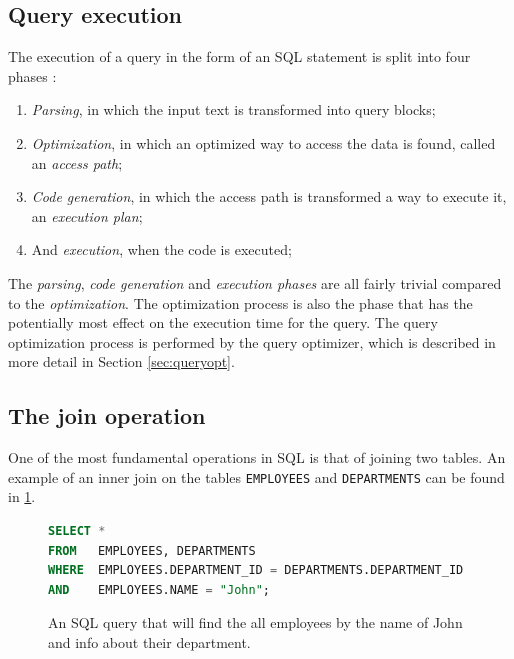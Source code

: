 \subsection{Query execution}
The execution of a query in the form of an SQL statement is split into four phases \cite{selinger_1979_access_apsiardms}:
\begin{enumerate}
    \item \textit{Parsing}, in which the input text is transformed into query blocks;
    \item \textit{Optimization}, in which an optimized way to access the data is found, called an \textit{access path};
    \item \textit{Code generation}, in which the access path is transformed a way to execute it, an \textit{execution plan};
    \item And \textit{execution}, when the code is executed;
\end{enumerate}

The \textit{parsing}, \textit{code generation} and \textit{execution phases} are all fairly trivial compared to the \textit{optimization}. The optimization process is also the phase that has the potentially most effect on the execution time for the query. The query optimization process is performed by the query optimizer, which is described in more detail in Section \ref{sec:queryopt}.

\subsection{The join operation}
One of the most fundamental operations in SQL is that of joining two tables. An example of an inner join on the tables \texttt{EMPLOYEES} and \texttt{DEPARTMENTS} can be found in \ref{fig:sql:joinop}.

\begin{figure}[ht]
\begin{lstlisting}[language=SQL]
SELECT *
FROM   EMPLOYEES, DEPARTMENTS
WHERE  EMPLOYEES.DEPARTMENT_ID = DEPARTMENTS.DEPARTMENT_ID
AND    EMPLOYEES.NAME = "John";
\end{lstlisting}
\caption[An example of an SQL query]{An SQL query that will find the all employees by the name of John and info about their department.}\label{fig:sql:joinop}
\end{figure}

